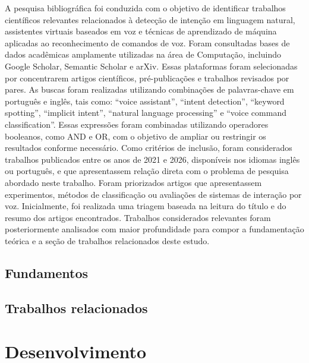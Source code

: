 \documentclass[
    12pt,                %
    openright,           %
    oneside,             %
    a4paper,             %
    english,             %
    brazil               %
]{abntex2}
\begin{document}
A pesquisa bibliográfica foi conduzida com o objetivo de identificar trabalhos científicos
relevantes relacionados à detecção de intenção em linguagem natural, assistentes virtuais
baseados em voz e técnicas de aprendizado de máquina aplicadas ao reconhecimento de
comandos de voz.
Foram consultadas bases de dados acadêmicas amplamente utilizadas na área de
Computação, incluindo Google Scholar, Semantic Scholar e arXiv. Essas plataformas foram
selecionadas por concentrarem artigos científicos, pré-publicações e trabalhos revisados
por pares.
As buscas foram realizadas utilizando combinações de palavras-chave em português
e inglês, tais como: “voice assistant”, “intent detection”, “keyword spotting”, “implicit
intent”, “natural language processing” e “voice command classification”. Essas expressões
foram combinadas utilizando operadores booleanos, como AND e OR, com o objetivo de
ampliar ou restringir os resultados conforme necessário.
Como critérios de inclusão, foram considerados trabalhos publicados entre os anos de
2021 e 2026, disponíveis nos idiomas inglês ou português, e que apresentassem relação
direta com o problema de pesquisa abordado neste trabalho. Foram priorizados artigos
que apresentassem experimentos, métodos de classificação ou avaliações de sistemas de
interação por voz.
Inicialmente, foi realizada uma triagem baseada na leitura do título e do resumo dos
artigos encontrados. Trabalhos considerados relevantes foram posteriormente analisados
com maior profundidade para compor a fundamentação teórica e a seção de trabalhos
relacionados deste estudo.

\section{Fundamentos}
\label{sec:fundamentos}


\section{Trabalhos relacionados}
\label{sec:trabalhos_relacionados}



\chapter{Desenvolvimento}
\label{cap:desenvolvimento}
\end{document}
